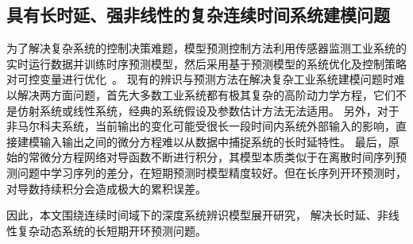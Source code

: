 \subsection{具有长时延、强非线性的复杂连续时间系统建模问题}
为了解决复杂系统的控制决策难题，模型预测控制方法利用传感器监测工业系统的实时运行数据并训练时序预测模型，然后采用基于预测模型的系统优化及控制策略对可控变量进行优化~\cite{Yuan2020,Member2019,wu2020optimization}。
现有的辨识与预测方法在解决复杂工业系统建模问题时难以解决两方面问题，首先大多数工业系统都有极其复杂的高阶动力学方程，它们不是仿射系统或线性系统，经典的系统假设及参数估计方法无法适用。
另外，对于非马尔科夫系统，当前输出的变化可能受很长一段时间内系统外部输入的影响，直接建模输入输出之间的微分方程难以从数据中捕捉系统的长时延特性。
最后，原始的常微分方程网络对导函数不断进行积分，其模型本质类似于在离散时间序列预测问题中学习序列的差分，在短期预测时模型精度较好。但在长序列开环预测时，对导数持续积分会造成极大的累积误差。

因此，本文围绕连续时间域下的深度系统辨识模型展开研究，
解决长时延、非线性复杂动态系统的长短期开环预测问题。

